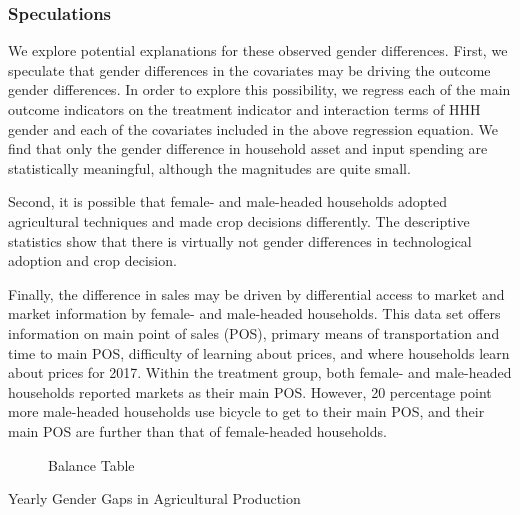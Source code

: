 \documentclass[12pt]{article}
\begin{document}
\subsubsection*{Speculations}
We explore potential explanations for these observed gender differences. First, we speculate that gender differences in the covariates may be driving the outcome gender differences. In order to explore this possibility, we regress each of the main outcome indicators on the treatment indicator and interaction terms of HHH gender and each of the covariates included in the above regression equation. We find that only the gender difference in household asset and input spending are statistically meaningful, although the magnitudes are quite small. 

Second, it is possible that female- and male-headed households adopted agricultural techniques and made crop decisions differently. The descriptive statistics show that there is virtually not gender differences in technological adoption and crop decision.

Finally, the difference in sales may be driven by differential access to market and market information by female- and male-headed households. This data set offers information on main point of sales (POS), primary means of transportation and time to main POS, difficulty of learning about prices, and where households learn about prices for 2017. Within the treatment group, both female- and male-headed households reported markets as their main POS. However, 20 percentage point more male-headed households use bicycle to get to their main POS, and their main POS are further than that of female-headed households. 
	
\pagebreak
	\begin{figure}[H]
	\caption{Balance Table}
	\begin{adjustbox}{width=0.95 \textwidth, center}
		
	\end{adjustbox}
	\label{fig:balance_1B}
	\end{figure}

	\begin{table}[H]
	\caption{Yearly Gender Gaps in Agricultural Production}	
	\begin{center}
		\scalebox{0.5}{}
	\end{center}
	\label{tab:mainReg}
	\end{table}

	
\end{document}

